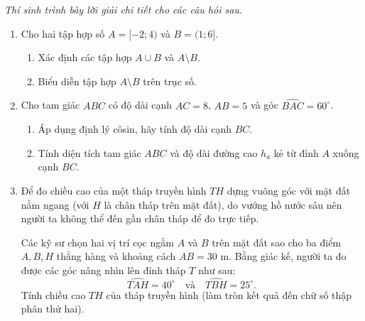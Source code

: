 \documentclass[12pt,a4paper]{article}
\newcommand{\parttitle}[1]{\par\vspace{2pt}{\large\bfseries\color{ink}#1}\par\vspace{1pt}}
\begin{document}
\parttitle{PHẦN IV. Tự luận}
\textit{Thí sinh trình bày lời giải chi tiết cho các câu hỏi sau.}
\begin{enumerate}
\item Cho hai tập hợp số $A = [-2; 4)$ và $B = (1; 6]$.
\begin{enumerate}
    \item Xác định các tập hợp $A \cup B$ và $A \setminus B$.
    \item Biểu diễn tập hợp $A \setminus B$ trên trục số.
\end{enumerate}

\item Cho tam giác $ABC$ có độ dài cạnh $AC = 8$, $AB = 5$ và góc $\widehat{BAC} = 60^\circ$.
\begin{enumerate}
    \item Áp dụng định lý côsin, hãy tính độ dài cạnh $BC$.
    \item Tính diện tích tam giác $ABC$ và độ dài đường cao $h_a$ kẻ từ đỉnh $A$ xuống cạnh $BC$.
\end{enumerate}

\item \begin{minipage}[t]{0.58\linewidth}
Để đo chiều cao của một tháp truyền hình $TH$ dựng vuông góc với mặt đất nằm ngang (với $H$ là chân tháp trên mặt đất), do vướng hồ nước sâu nên người ta không thể đến gần chân tháp để đo trực tiếp.
\par
Các kỹ sư chọn hai vị trí cọc ngắm $A$ và $B$ trên mặt đất sao cho ba điểm $A, B, H$ thẳng hàng và khoảng cách $AB = 30\text{ m}$. Bằng giác kế, người ta đo được các góc nâng nhìn lên đỉnh tháp $T$ như sau:
\[
\widehat{TAH} = 40^\circ \quad \text{và} \quad \widehat{TBH} = 25^\circ.
\]
Tính chiều cao $TH$ của tháp truyền hình (làm tròn kết quả đến chữ số thập phân thứ hai).
\end{minipage}\hfill
\begin{minipage}[t]{0.40\linewidth}
\vspace{-0.3\baselineskip}
\centering
{}
\end{minipage}
\end{enumerate}
\end{document}
